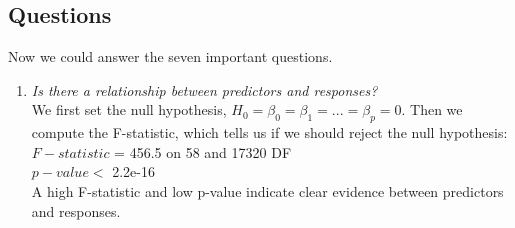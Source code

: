 \subsection{Questions}
Now we could answer the seven important questions.
\begin{enumerate}
  \item \textit{Is there a relationship between predictors and responses?}\\
   We first set the null hypothesis, $H_0 = \beta_0 = \beta_1 = ... = \beta_p = 0$. Then we compute the F-statistic, which tells us if we should reject the null hypothesis:
      \\$F-statistic$ = 456.5 on 58 and 17320 DF  \\$p-value <$ 2.2e-16\\
   A high F-statistic and low p-value indicate clear evidence between predictors and responses.


\end{enumerate}
